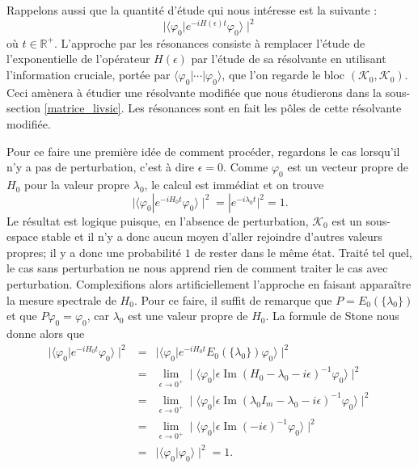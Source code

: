 \documentclass[12pt,openany,a4paper, titlepage]{article}
\newcommand{\lp}{\left(}
\newcommand{\rp}{\right)}
\newcommand{\R}{\mathbb{R}}
\newcommand{\KK}{\mathcal{K}}
\newcommand{\vp}{\varphi}
\newcommand{\inv}{^{-1}}
\newcommand{\im}{\operatorname{Im}}
\newcommand{\limeo}{\lim\limits_{\epsilon \rightarrow 0^+}}
\theoremstyle{definition}
\theoremstyle{definition}
\theoremstyle{definition}
\theoremstyle{definition}
\theoremstyle{definition}
\theoremstyle{definition}
\begin{document}
Rappelons aussi que la quantité d'étude qui nous intéresse est la suivante : 
\begin{equation}
    \mid \langle \vp_0 | e^{-iH(\epsilon) t} \vp_0 \rangle\mid^2
\end{equation}
où $t\in\R^+$. L'approche par les résonances consiste à remplacer l'étude de l'exponentielle de l'opérateur $H(\epsilon)$ par l'étude de sa résolvante en utilisant l'information cruciale, portée par $\langle \vp_0 | \cdots |\vp_0 \rangle$,  que l'on regarde le bloc $(\mathcal{K}_0,\mathcal{K}_0)$. Ceci amènera à étudier une résolvante modifiée que nous étudierons dans la sous-section \ref{matrice_livsic}. Les résonances sont en fait les pôles de cette résolvante modifiée. 

Pour ce faire une première idée de comment procéder, regardons le cas lorsqu'il n'y a pas de perturbation, c'est à dire $\epsilon = 0$. Comme $\vp_0$ est un vecteur propre de $H_0$ pour la valeur propre $\lambda_0$, le calcul est immédiat et on trouve 
\begin{equation}
    \mid \langle \vp_0 | e^{-iH_0t} \vp_0 \rangle\mid^2 = |e^{-i\lambda_0t}|^2 = 1.
\end{equation}
Le résultat est logique puisque, en l'absence de perturbation, $\KK_0$ est un sous-espace stable et il n'y a donc aucun moyen d'aller rejoindre d'autres valeurs propres; il y a donc une probabilité $1$ de rester dans le même état. Traité tel quel, le cas sans perturbation ne nous apprend rien de comment traiter le cas avec perturbation. Complexifions alors artificiellement l'approche en faisant apparaître la mesure spectrale de $H_0$. Pour ce faire, il suffit de remarque que $P = E_0(\{\lambda_0\})$ et que $P\vp_0 = \vp_0$, car $\lambda_0$ est une valeur propre de $H_0$. La formule de Stone nous donne alors que 
\begin{eqnarray*}
    \mid \langle \vp_0 | e^{-iH_0t} \vp_0 \rangle\mid^2 &=&\mid \langle \vp_0 | e^{-iH_0t}E_0(\{\lambda_0\}) \vp_0 \rangle\mid^2
    \\ &=& \limeo \mid \langle \vp_0 | \epsilon\im\lp H_0 - \lambda_0 - i\epsilon\rp\inv \vp_0 \rangle\mid^2 \\
    &=& \limeo \mid \langle \vp_0 | \epsilon\im\lp \lambda_0 I_m - \lambda_0 - i\epsilon\rp\inv \vp_0 \rangle\mid^2 \\
    &=&  \limeo \mid \langle \vp_0 | \epsilon\im\lp - i\epsilon\rp\inv \vp_0 \rangle\mid^2\\
    &=&  \mid \langle \vp_0 | \vp_0 \rangle\mid^2 = 1.
\end{eqnarray*}
\end{document}
